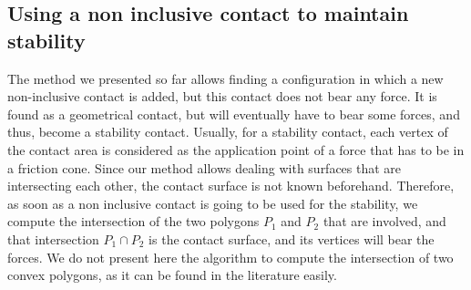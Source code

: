 
\subsection{Using a non inclusive contact to maintain stability}
\label{subsec:stability}
The method we presented so far allows finding a configuration in which a new non-inclusive contact is added, but this contact does not bear any force. It is found as a geometrical contact, but will eventually have to bear some forces, and thus, become a stability contact.
Usually, for a stability contact, each vertex of the contact area is considered as the application point of a force that has to be in a friction cone. Since our method allows dealing with surfaces that are intersecting each other, the contact surface is not known beforehand. Therefore, as soon as a non inclusive contact is going to be used for the stability, we compute the intersection of the two polygons $P_1$ and $P_2$ that are involved, and that intersection $P_1 \cap P_2$ is the contact surface, and its vertices will bear the forces. We do not present here the algorithm to compute the intersection of two convex polygons, as it can be found in the literature easily.


